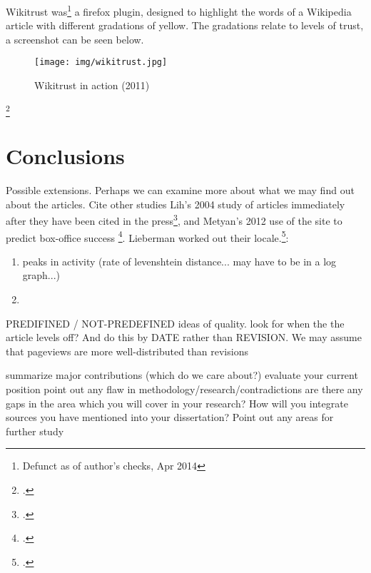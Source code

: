 \documentclass[a4paper,11pt,twoside,notitlepage]{article}
\renewcommand{\cite}[1]{\footcite{#1}}
\begin{document}
        Wikitrust was\footnote{Defunct as of author's checks, Apr
          2014} a firefox plugin, designed to highlight the
        words of a Wikipedia article with different gradations of
        yellow. The gradations relate to levels of trust, a screenshot
        can be seen below.
        
       \begin{figure}
         \centering
         \texttt{[image: img/wikitrust.jpg]}
         \caption{Wikitrust in action (2011)}
         \label{fig:wikitrust}
       \end{figure}

 \cite{Lucassen2011} 

        \section{Conclusions}
        
                
        Possible extensions.  Perhaps we can examine more about what
        we may find out about the articles. Cite other studies Lih's
        2004 study of articles immediately after they have been cited
        in the press\cite{Lih2004}, and Metyan's 2012 use of the site
        to predict box-office success \cite{Mestyan2012}. Lieberman
        worked out their locale.\cite{Lieberman2009}:

        \begin{enumerate}
          \item peaks in activity (rate of levenshtein distance... may
            have to be in a log graph...)
          \item 
        \end{enumerate}

        PREDIFINED / NOT-PREDEFINED ideas of quality. look for when
        the the article levels off? And do this by DATE rather than
        REVISION. We may assume that pageviews are more
        well-distributed than revisions

        summarize major contributions (which do we care about?)
        evaluate your current position point out any flaw in
        methodology/research/contradictions are there any gaps in the
        area which you will cover in your research?  How will you
        integrate sources you have mentioned into your dissertation?
        Point out any areas for further study
\end{document}
